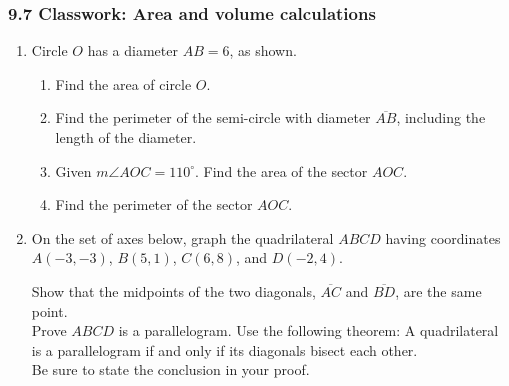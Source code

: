 \documentclass[12pt, twoside]{article}
\begin{document}
\subsubsection*{9.7 Classwork: Area and volume calculations}
 \begin{enumerate}

 \item Circle $O$ has a diameter $AB=6$, as shown.
       \begin{center}
     \end{center}
     \begin{enumerate}
       \item Find the area of circle $O$. \vspace{2.5cm}
       \item Find the perimeter of the semi-circle with diameter $\overline{AB}$, including the length of the diameter. \vspace{2.5cm}
       \item Given $m\angle AOC=110^\circ$. Find the area of the sector $AOC$. \vspace{2.5cm}
       \item Find the perimeter of the sector $AOC$.
     \end{enumerate}

\newpage
\item On the set of axes below, graph the quadrilateral $ABCD$ having coordinates $A(-3,-3)$, $B(5,1)$, $C(6,8)$, and $D(-2,4)$.
  \begin{center} %
  \end{center}
  Show that the midpoints of the two diagonals, $\overline{AC}$ and $\overline{BD}$, are the same point. \\[5cm]
  Prove $ABCD$ is a parallelogram. Use the following theorem:
  A quadrilateral is a parallelogram if and only if its diagonals bisect each other. \\[0.5cm]
  Be sure to state the conclusion in your proof.


\end{enumerate}
\end{document}
